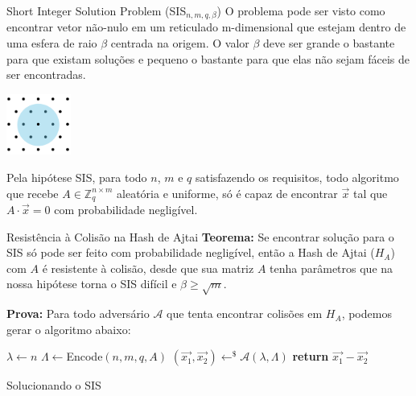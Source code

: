 \documentclass{beamer}
\begin{document}
\begin{frame}{Short Integer Solution Problem (SIS$_{n, m, q, \beta}$)}
    O problema pode ser visto como encontrar vetor não-nulo em um reticulado m-dimensional que estejam dentro de uma esfera de raio $\beta$ centrada na origem. O valor $\beta$ deve ser grande o bastante para que existam soluções e pequeno o bastante para que elas não sejam fáceis de ser encontradas.
    
    \includegraphics[height=2cm]{imagens/sis.png}
    
    Pela hipótese SIS, para todo $n$, $m$ e $q$ satisfazendo os requisitos, todo algoritmo que recebe $A\in\mathbb{Z}_q^{n\times m}$ aleatória e uniforme, só é capaz de encontrar $\overrightarrow{x}$ tal que $A\cdot \overrightarrow{x}=0$ com probabilidade negligível.
\end{frame}

\begin{frame}{Resistência à Colisão na Hash de Ajtai}
    \textbf{Teorema: }Se encontrar solução para o SIS só pode ser feito com probabilidade negligível, então a Hash de Ajtai ($H_A$) com $A$ é resistente à colisão, desde que sua matriz $A$ tenha parâmetros que na nossa hipótese torna o SIS difícil e $\beta \geq \sqrt{m}$.
    
    \textbf{Prova: }Para todo adversário $\mathcal{A}$ que tenta encontrar colisões em $H_A$, podemos gerar o algoritmo abaixo:
    
    \begin{algorithm}[H]
    \SetAlgoLined
    $\lambda \leftarrow n$\;
    $\Lambda \leftarrow$Encode$(n, m, q, A)$\;
    $(\overrightarrow{x_1},\overrightarrow{x_2})\leftarrow^{\$}\mathcal{A}(\lambda,\Lambda)$\;
    \textbf{return} $\overrightarrow{x_1}-\overrightarrow{x_2}$\;
    \caption{Solucionando o SIS}
\end{algorithm}
\end{frame}
\end{document}
